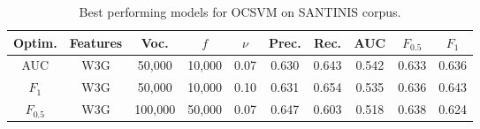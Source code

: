 
\begin{table}[t]
	\center
	\caption{Best performing models for OCSVM on SANTINIS corpus.}\label{chap:noise:tbl:OCSVME_SANTINIS}
	\begin{adjustbox}{width=\textwidth}
	\begin{tabular}{c c c c c c c c c c}
		\hline
		Optim. & Features & Voc. & $f$ & $\nu$ & Prec. & Rec. & AUC & $F_{0.5}$ & $F_{1}$ \\
		\hline
		AUC & W3G & 50,000 & 10,000 & 0.07 & 0.630 & 0.643 & 0.542 & 0.633 & 0.636 \\
		$F_{1}$ & W3G & 50,000 & 10,000 & 0.10 & 0.631 & 0.654 & 0.535 & 0.636 & 0.643 \\
		$F_{0.5}$ & W3G & 100,000 & 50,000 & 0.07 & 0.647 & 0.603 & 0.518 & 0.638 & 0.624\\
		\hline
	\end{tabular}
\end{adjustbox}	
\end{table}

% 
% 


